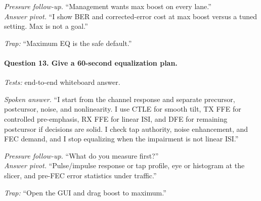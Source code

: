 \textit{Pressure follow-up.} ``Management wants max boost on every lane.''\\
\textit{Answer pivot.} ``I show BER and corrected-error cost at max boost versus
a tuned setting. Max is not a goal.''

\textit{Trap:} ``Maximum EQ is the safe default.''

\paragraph{Question 13. Give a 60-second equalization plan.}
\textit{Tests:} end-to-end whiteboard answer.

\textit{Spoken answer.}
``I start from the channel response and separate precursor, postcursor, noise,
and nonlinearity. I use CTLE for smooth tilt, TX FFE for controlled pre-emphasis,
RX FFE for linear ISI, and DFE for remaining postcursor if decisions are solid.
I check tap authority, noise enhancement, and FEC demand, and I stop equalizing
when the impairment is not linear ISI.''

\textit{Pressure follow-up.} ``What do you measure first?''\\
\textit{Answer pivot.} ``Pulse/impulse response or tap profile, eye or histogram
at the slicer, and pre-FEC error statistics under traffic.''

\textit{Trap:} ``Open the GUI and drag boost to maximum.''
